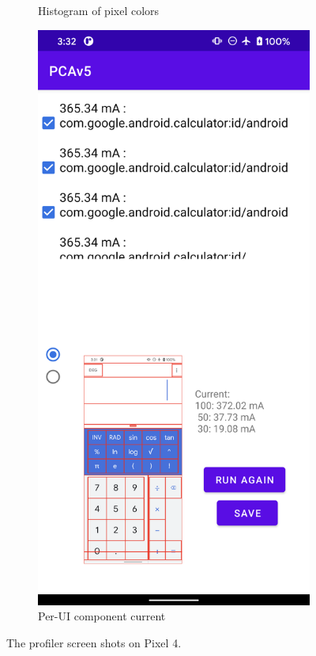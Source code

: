 \begin{figure}[tp]
\begin{subfigure}[]{0.30\columnwidth}
		\caption{Histogram of pixel colors}
		\label{fig:tool1_screenshot_d}
	\end{subfigure}
        \hfill 
	\begin{subfigure}[]{0.30\columnwidth}
		\includegraphics[width=\textwidth]{figure/002_app_break_down.png}
		\caption{Per-UI component current}
		\label{fig:tool1_screenshot_c}
	\end{subfigure}
        \vspace{-0.1in}
	\caption{The \name profiler screen shots on Pixel 4.}
	\label{fig:tool1_screenshot}
    \vspace{-0.1in}
\end{figure}

